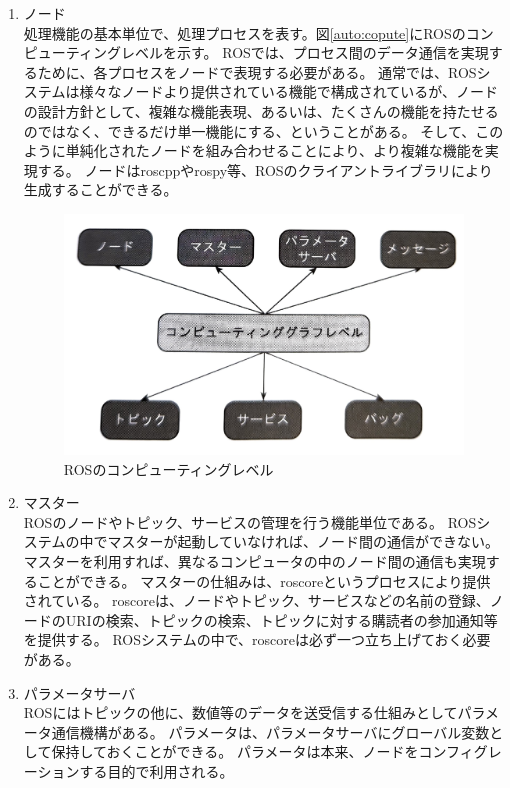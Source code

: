 \begin{enumerate}
  \item ノード\\
  処理機能の基本単位で、処理プロセスを表す。図\ref{auto:copute}にROSのコンピューティングレベルを示す。
  ROSでは、プロセス間のデータ通信を実現するために、各プロセスをノードで表現する必要がある。
  通常では、ROSシステムは様々なノードより提供されている機能で構成されているが、ノードの設計方針として、複雑な機能表現、あるいは、たくさんの機能を持たせるのではなく、できるだけ単一機能にする、ということがある。
  そして、このように単純化されたノードを組み合わせることにより、より複雑な機能を実現する。
  ノードはroscppやrospy等、ROSのクライアントライブラリにより生成することができる。
  \begin{figure}[h]
    \begin{center}
      \includegraphics[width=.75\linewidth]{img/auto_7.pdf}
      \caption{ROSのコンピューティングレベル}
      \label{auto:compute}
    \end{center}
  \end{figure}
  \item マスター\\
  ROSのノードやトピック、サービスの管理を行う機能単位である。
  ROSシステムの中でマスターが起動していなければ、ノード間の通信ができない。
  マスターを利用すれば、異なるコンピュータの中のノード間の通信も実現することができる。
  マスターの仕組みは、roscoreというプロセスにより提供されている。
  roscoreは、ノードやトピック、サービスなどの名前の登録、ノードのURIの検索、トピックの検索、トピックに対する購読者の参加通知等を提供する。
  ROSシステムの中で、roscoreは必ず一つ立ち上げておく必要がある。
  \item パラメータサーバ\\
  ROSにはトピックの他に、数値等のデータを送受信する仕組みとしてパラメータ通信機構がある。
  パラメータは、パラメータサーバにグローバル変数として保持しておくことができる。
  パラメータは本来、ノードをコンフィグレーションする目的で利用される。

\end{enumerate}
